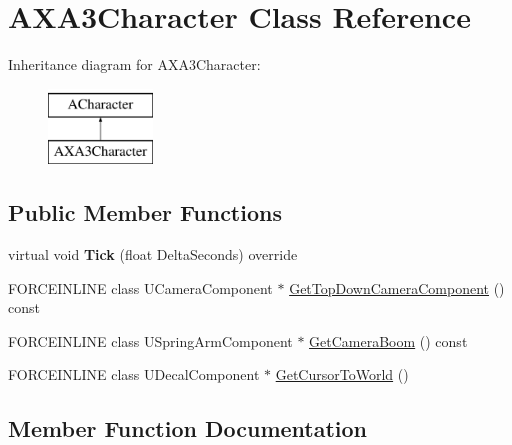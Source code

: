 \hypertarget{class_a_x_a3_character}{}\section{A\+X\+A3\+Character Class Reference}
\label{class_a_x_a3_character}
Inheritance diagram for A\+X\+A3\+Character\+:\begin{figure}[H]
\begin{center}
\leavevmode
\includegraphics[height=2.000000cm]{class_a_x_a3_character}
\end{center}
\end{figure}
\subsection*{Public Member Functions}
\begin{DoxyCompactItemize}
\item 
\hypertarget{class_a_x_a3_character_ae2250498d9229d83448ddd91c05470d1}{}\label{class_a_x_a3_character_ae2250498d9229d83448ddd91c05470d1} 
virtual void {\bfseries Tick} (float Delta\+Seconds) override
\item 
F\+O\+R\+C\+E\+I\+N\+L\+I\+NE class U\+Camera\+Component $\ast$ \hyperlink{class_a_x_a3_character_a89f06b20e3c4350a374a821345bf424c}{Get\+Top\+Down\+Camera\+Component} () const
\item 
F\+O\+R\+C\+E\+I\+N\+L\+I\+NE class U\+Spring\+Arm\+Component $\ast$ \hyperlink{class_a_x_a3_character_ab8949643f5090f747b9882d8c7640748}{Get\+Camera\+Boom} () const
\item 
F\+O\+R\+C\+E\+I\+N\+L\+I\+NE class U\+Decal\+Component $\ast$ \hyperlink{class_a_x_a3_character_aea6ee1ad712275c59026b4c7b7b8edf2}{Get\+Cursor\+To\+World} ()
\end{DoxyCompactItemize}


\subsection{Member Function Documentation}
\hypertarget{class_a_x_a3_character_ab8949643f5090f747b9882d8c7640748}{}\label{class_a_x_a3_character_ab8949643f5090f747b9882d8c7640748} 
